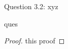 \begin{solution}{Question 3.2: xyz}\label{ques:32}
    \begin{question}
    ques
    \end{question}
    \tcblower{}
    \begin{proof}
    this proof
    \end{proof}
\end{solution}
